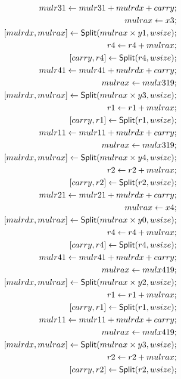 \begin{align*}
mulr31 \leftarrow mulr31 + mulrdx + carry; \\
mulrax \leftarrow x3; \\
\concat{mulrdx}{mulrax} \leftarrow \dslcode{Split}(mulrax \times y1, wsize); \\
r4 \leftarrow r4 + mulrax; \\
\concat{carry}{r4} \leftarrow \dslcode{Split}(r4, wsize); \\
mulr41 \leftarrow mulr41 + mulrdx + carry; \\
mulrax \leftarrow mulx319; \\
\concat{mulrdx}{mulrax} \leftarrow \dslcode{Split}(mulrax \times y3, wsize); \\
r1 \leftarrow r1 + mulrax; \\
\concat{carry}{r1} \leftarrow \dslcode{Split}(r1, wsize); \\
mulr11 \leftarrow mulr11 + mulrdx + carry; \\
mulrax \leftarrow mulx319; \\
\concat{mulrdx}{mulrax} \leftarrow \dslcode{Split}(mulrax \times y4, wsize); \\
r2 \leftarrow r2 + mulrax; \\
\concat{carry}{r2} \leftarrow \dslcode{Split}(r2, wsize); \\
mulr21 \leftarrow mulr21 + mulrdx + carry; \\
mulrax \leftarrow x4; \\
\concat{mulrdx}{mulrax} \leftarrow \dslcode{Split}(mulrax \times y0, wsize); \\
r4 \leftarrow r4 + mulrax; \\
\concat{carry}{r4} \leftarrow \dslcode{Split}(r4, wsize); \\
mulr41 \leftarrow mulr41 + mulrdx + carry; \\
mulrax \leftarrow mulx419; \\
\concat{mulrdx}{mulrax} \leftarrow \dslcode{Split}(mulrax \times y2, wsize); \\
r1 \leftarrow r1 + mulrax; \\
\concat{carry}{r1} \leftarrow \dslcode{Split}(r1, wsize); \\
mulr11 \leftarrow mulr11 + mulrdx + carry; \\
mulrax \leftarrow mulx419; \\
\concat{mulrdx}{mulrax} \leftarrow \dslcode{Split}(mulrax \times y3, wsize); \\
r2 \leftarrow r2 + mulrax; \\
\concat{carry}{r2} \leftarrow \dslcode{Split}(r2, wsize); \\

\end{align*}
